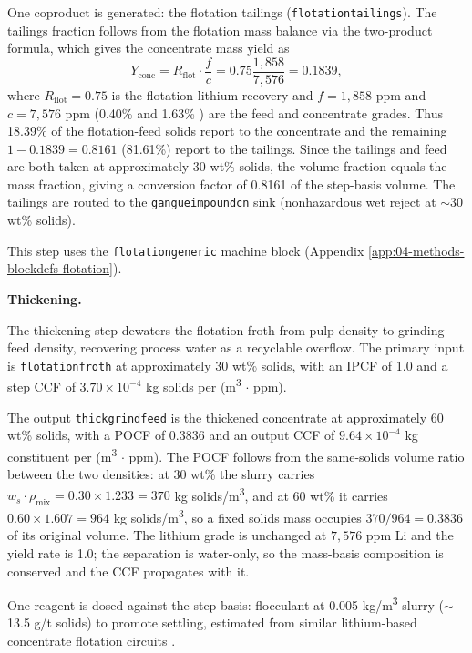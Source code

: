 \documentclass{article}
\renewcommand\_{\textunderscore\allowbreak}
\begin{document}
One coproduct is generated: the flotation tailings (\texttt{flotation\_tailings}). The tailings fraction follows from the flotation mass balance via the two-product formula, which gives the concentrate mass yield as
\[
	Y_{\text{conc}} = R_{\text{flot}} \cdot \frac{f}{c} = 0.75 \frac{1,858}{7,576} = 0.1839,
\]
where $R_{\text{flot}} = 0.75$ is the flotation lithium recovery and $f = 1,858$ ppm and $c = 7,576$ ppm  (0.40\% and 1.63\% ) are the feed and concentrate grades. Thus 18.39\% of the flotation-feed solids report to the concentrate and the remaining $1 - 0.1839 = 0.8161$ (81.61\%) report to the tailings. Since the tailings and feed are both taken at approximately 30 wt\% solids, the volume fraction equals the mass fraction, giving a conversion factor of 0.8161 of the step-basis volume. The tailings are routed to the \texttt{gangue\_impound\_cn\_30} sink (nonhazardous wet reject at $\sim$30 wt\% solids).

This step uses the \texttt{flotation\_generic} machine block (Appendix \ref{app:04-methods-blockdefs-flotation}).

\medskip
\noindent\textbf{Thickening.}\quad

The thickening step dewaters the flotation froth from pulp density to grinding-feed density, recovering process water as a recyclable overflow. The primary input is \texttt{flotation\_froth} at approximately 30 wt\% solids, with an IPCF of 1.0 and a step CCF of $3.70 \times 10^{-4}$ kg solids per (\si{m^3} $\cdot$ ppm).

The output \texttt{thick\_grind\_feed} is the thickened concentrate at approximately 60 wt\% solids, with a POCF of 0.3836 and an output CCF of $9.64 \times 10^{-4}$ kg constituent per (\si{m^3} $\cdot$ ppm). The POCF follows from the same-solids volume ratio between the two densities: at 30 wt\% the slurry carries $w_s \cdot \rho_{\text{mix}} = 0.30 \times 1.233 = 370$ kg solids/\si{m^3}, and at 60 wt\% it carries $0.60 \times 1.607 = 964$ kg solids/\si{m^3}, so a fixed solids mass occupies $370/964 = 0.3836$ of its original volume. The lithium grade is unchanged at $7,576$ ppm Li and the yield rate is 1.0; the separation is water-only, so the mass-basis composition is conserved and the CCF propagates with it.

One reagent is dosed against the step basis: flocculant at 0.005 \si{kg/m^3} slurry ($\sim$13.5 g/t solids) to promote settling, estimated from similar lithium-based concentrate flotation circuits \cite{opokuOverviewCoarseParticle2025, tramflocPolymersWaterWastewater2013}. 
\end{document}

